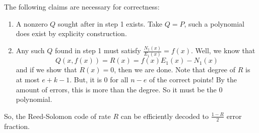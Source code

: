 The following claims are necessary for correctness:
\begin{enumerate}
    \item A nonzero $Q$ sought after in step 1 exists. Take $Q = P$, such a polynomial does exist by explicity construction.
    \item Any such $Q$ found in step 1 must satisfy $\frac{N_1(x)}{E_1(x)} = f(x)$. Well, we know that
    \[ Q(x, f(x)) = R(x) = f(x) E_1(x) - N_1(x) \]
    and if we show that $R(x) = 0$, then we are done. Note that degree of $R$ is at most $e + k - 1$. But, it is $0$ for all $n - e$ of the correct
    points! By the amount of errors, this is more than the degree. So it must be the 0 polynomial.
\end{enumerate}

So, the Reed-Solomon code of rate $R$ can be efficiently decoded to $\frac{1 - R}{2}$ error fraction.